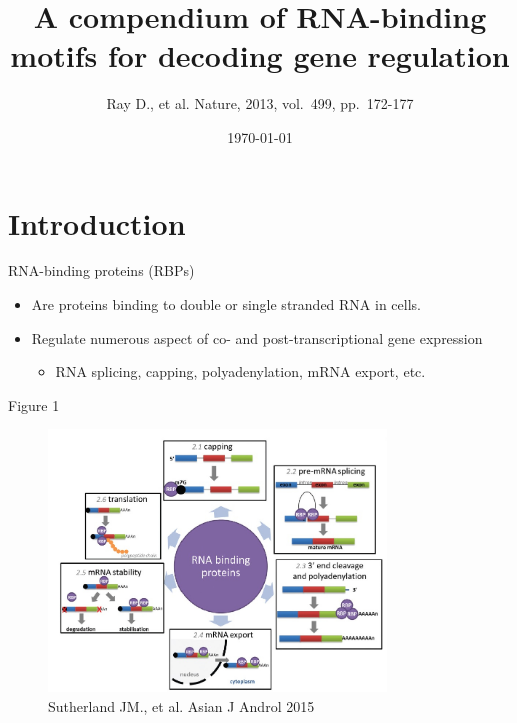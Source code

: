 \documentclass[professionalfont, 12pt, default]{beamer}
\title{A compendium of RNA-binding motifs for decoding gene regulation}
\author{Ray D., et al. Nature, 2013, vol.~499, pp.~172-177}
\date{\today}
\providecommand{\tightlist}{%
    \setlength{\itemsep}{0pt}\setlength{\parskip}{0pt}}
\begin{document}
\frame{\titlepage}

\section{Introduction}\label{introduction}

\begin{frame}{RNA-binding proteins (RBPs)}

\begin{itemize}
\tightlist
\item
  Are proteins binding to double or single stranded RNA in cells.
\item
  Regulate numerous aspect of co- and post-transcriptional gene
  expression

  \begin{itemize}
  \tightlist
  \item
    RNA splicing, capping, polyadenylation, mRNA export, etc.
  \end{itemize}
\end{itemize}

\end{frame}

\begin{frame}{Figure 1}

\begin{figure}
\centering
\includegraphics[width=0.80000\textwidth]{img/RBPs1.jpg}
\caption{Sutherland JM., et al. Asian J Androl 2015}
\end{figure}

\end{frame}
\end{document}

